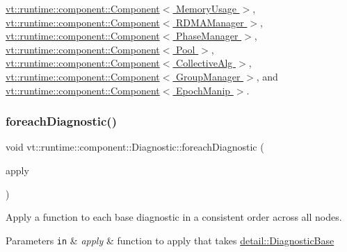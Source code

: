 \hyperlink{structvt_1_1runtime_1_1component_1_1_component_adaf8bd995d4c91702e2ff7806ad9e695}{vt\+::runtime\+::component\+::\+Component$<$ Memory\+Usage $>$}, \hyperlink{structvt_1_1runtime_1_1component_1_1_component_adaf8bd995d4c91702e2ff7806ad9e695}{vt\+::runtime\+::component\+::\+Component$<$ R\+D\+M\+A\+Manager $>$}, \hyperlink{structvt_1_1runtime_1_1component_1_1_component_adaf8bd995d4c91702e2ff7806ad9e695}{vt\+::runtime\+::component\+::\+Component$<$ Phase\+Manager $>$}, \hyperlink{structvt_1_1runtime_1_1component_1_1_component_adaf8bd995d4c91702e2ff7806ad9e695}{vt\+::runtime\+::component\+::\+Component$<$ Pool $>$}, \hyperlink{structvt_1_1runtime_1_1component_1_1_component_adaf8bd995d4c91702e2ff7806ad9e695}{vt\+::runtime\+::component\+::\+Component$<$ Collective\+Alg $>$}, \hyperlink{structvt_1_1runtime_1_1component_1_1_component_adaf8bd995d4c91702e2ff7806ad9e695}{vt\+::runtime\+::component\+::\+Component$<$ Group\+Manager $>$}, and \hyperlink{structvt_1_1runtime_1_1component_1_1_component_adaf8bd995d4c91702e2ff7806ad9e695}{vt\+::runtime\+::component\+::\+Component$<$ Epoch\+Manip $>$}.

\mbox{\label{structvt_1_1runtime_1_1component_1_1_diagnostic_a1d6951af40ad0b4020860c0b21b1a85c}} 
\subsubsection{\texorpdfstring{foreach\+Diagnostic()}{foreachDiagnostic()}}
{\footnotesize\ttfamily void vt\+::runtime\+::component\+::\+Diagnostic\+::foreach\+Diagnostic (\begin{DoxyParamCaption}\item[{std\+::function$<$ void(\hyperlink{structvt_1_1runtime_1_1component_1_1detail_1_1_diagnostic_base}{detail\+::\+Diagnostic\+Base} $\ast$)$>$}]{apply }\end{DoxyParamCaption})}



Apply a function to each base diagnostic in a consistent order across all nodes. 


\begin{DoxyParams}[1]{Parameters}
\mbox{\tt in}  & {\em apply} & function to apply that takes {\ttfamily \hyperlink{structvt_1_1runtime_1_1component_1_1detail_1_1_diagnostic_base}{detail\+::\+Diagnostic\+Base}} \\
\hline
\end{DoxyParams}
\mbox{\label{structvt_1_1runtime_1_1component_1_1_diagnostic_a9c1f4174ac87bb6ae0ec186a08adbbbb}} 
